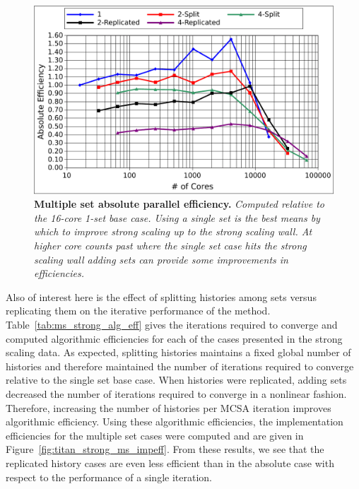 \begin{figure}[t!]
  \begin{center}
    \includegraphics[width=6in]{chapters/parallel_mc/titan_strong_ms_eff.pdf}
  \end{center}
  \caption{\textbf{Multiple set absolute parallel efficiency.}
    \textit{Computed relative to the 16-core 1-set base case. Using a
      single set is the best means by which to improve strong scaling
      up to the strong scaling wall. At higher core counts past where
      the single set case hits the strong scaling wall adding sets can
      provide some improvements in efficiencies.}}
  \label{fig:titan_strong_ms_eff}
\end{figure}

Also of interest here is the effect of splitting histories among sets
versus replicating them on the iterative performance of the
method. Table~\ref{tab:ms_strong_alg_eff} gives the iterations
required to converge and computed algorithmic efficiencies for each of
the cases presented in the strong scaling data. As expected, splitting
histories maintains a fixed global number of histories and therefore
maintained the number of iterations required to converge relative to
the single set base case. When histories were replicated, adding sets
decreased the number of iterations required to converge in a nonlinear
fashion. Therefore, increasing the number of histories per MCSA
iteration improves algorithmic efficiency. Using these algorithmic
efficiencies, the implementation efficiencies for the multiple set
cases were computed and are given in
Figure~\ref{fig:titan_strong_ms_impeff}. From these results, we see
that the replicated history cases are even less efficient than in the
absolute case with respect to the performance of a single iteration.


